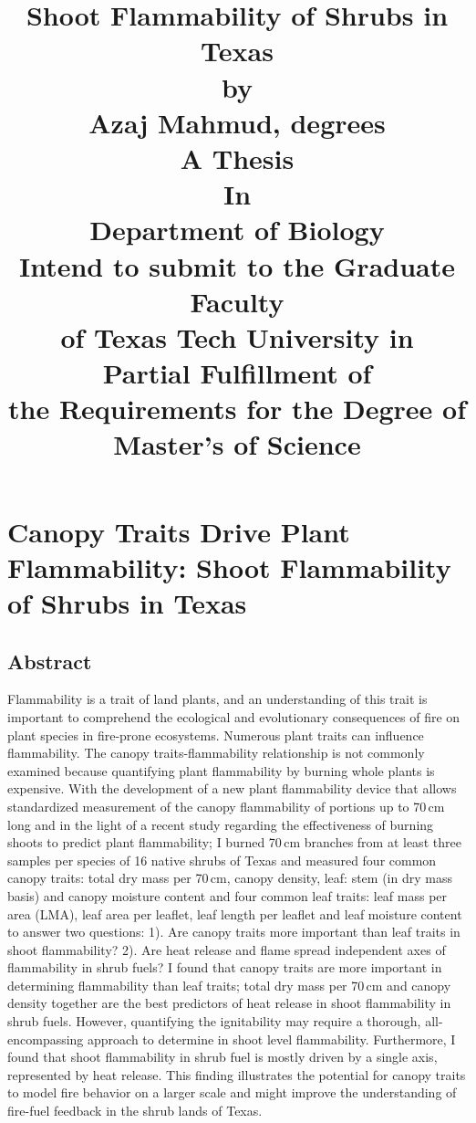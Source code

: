 \documentclass[12pt]{report}
\title{
Shoot Flammability of Shrubs in Texas\\[15pt]
by\\
Azaj Mahmud, degrees\\
A Thesis\\
In\\
Department of Biology\\
Intend to submit to the Graduate Faculty\\
of Texas Tech University in\\
Partial Fulfillment of\\
the Requirements for the Degree of\\
Master's of Science\\}
\begin{document}
\maketitle
\tableofcontents
\listoftables
\listoffigures
\doublespacing

\chapter{Canopy Traits Drive Plant Flammability: Shoot Flammability of Shrubs in Texas}


\section{Abstract}
    
Flammability is a trait of land plants, and an understanding of this trait is important to comprehend the ecological and evolutionary consequences of fire on plant species in fire-prone ecosystems. Numerous plant traits can influence flammability. The canopy traits-flammability relationship is not commonly examined because quantifying plant flammability by burning whole plants is expensive. With the development of a new plant flammability device that allows standardized measurement of the canopy
flammability of portions up to 70\,cm long and in the light of a recent study regarding the effectiveness of burning shoots to predict plant flammability; I burned 70\,cm branches from at least three samples per species of 16 native shrubs of Texas and measured four common canopy traits: total dry mass per 70\,cm, canopy density, leaf: stem (in dry mass basis) and canopy moisture content and four common leaf traits: leaf mass per area (LMA), leaf area per leaflet, leaf length per leaflet and leaf moisture content to answer two questions: 1).  Are canopy traits more important than leaf traits in shoot flammability? 2). Are heat release and flame spread independent axes of flammability in shrub fuels?  I found that canopy traits are more important in determining flammability than leaf traits; total dry mass per 70\,cm and canopy density together are the best predictors of heat release in shoot flammability in shrub fuels. However, quantifying the ignitability may require a thorough, all-encompassing approach to determine in shoot level flammability. Furthermore, I found that shoot flammability in shrub fuel is mostly driven by a single axis, represented by heat release. This finding illustrates the potential for canopy traits to model fire behavior on a larger scale and might improve the understanding of fire-fuel feedback in the shrub lands of Texas.
\end{document}
